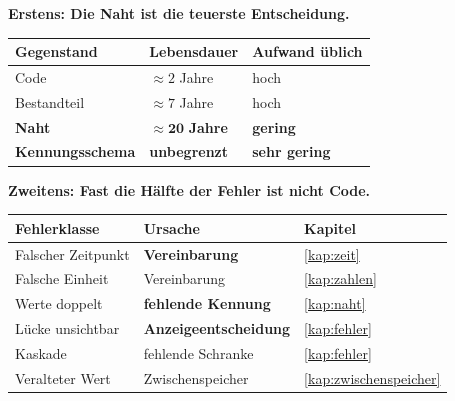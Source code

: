 \begin{merksatz}
\textbf{Erstens: Die Naht ist die teuerste Entscheidung.}

\begin{center}
\renewcommand{\arraystretch}{1.45}
\begin{tabular}{@{}P{2.8cm}P{2.2cm}P{2.6cm}@{}}
\toprule
\textbf{Gegenstand} & \textbf{Lebensdauer} & \textbf{Aufwand üblich}\\
\midrule
Code & $\approx2$ Jahre & \textcolor{gruen}{hoch}\\
Bestandteil & $\approx7$ Jahre & \textcolor{gruen}{hoch}\\
\textbf{Naht} & $\approx\mathbf{20}$ \textbf{Jahre} & \textcolor{akzent}{\textbf{gering}}\\
\textbf{Kennungs\-schema} & \textcolor{akzent}{\textbf{unbegrenzt}} & \textcolor{akzent}{\textbf{sehr gering}}\\
\bottomrule
\end{tabular}
\end{center}

\begin{center}
\end{center}

\textbf{Zweitens: Fast die Hälfte der Fehler ist nicht Code.}

\begin{center}
{\small
\renewcommand{\arraystretch}{1.45}
\begin{tabular}{@{}P{3.0cm}P{2.4cm}P{2.4cm}@{}}
\toprule
\textbf{Fehlerklasse} & \textbf{Ursache} & \textbf{Kapitel}\\
\midrule
Falscher Zeitpunkt & \textbf{Vereinbarung} & \ref{kap:zeit}\\
Falsche Einheit & Vereinbarung & \ref{kap:zahlen}\\
Werte doppelt & \textbf{fehlende Kennung} & \ref{kap:naht}\\
Lücke unsichtbar & \textbf{Anzeige\-entscheidung} & \ref{kap:fehler}\\
Kaskade & fehlende Schranke & \ref{kap:fehler}\\
Veralteter Wert & Zwischen\-speicher & \ref{kap:zwischenspeicher}\\
\bottomrule
\end{tabular}}
\end{center}


\end{merksatz}
